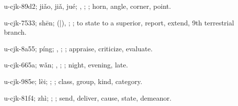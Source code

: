 \begin{multicols}{2}
{\cjkgGlue{}u-cjk-89d2; jiǎo, jiǎ, jué; \cjkgGlue{}, \cjkgGlue{}; \cjkgGlue{}; horn, angle, corner, point.

\cjkgGlue{}u-cjk-7533; shēn; \cjkgGlue{}\cjkgGlue{}(\cjkgGlue{}|\cjkgGlue{}), \cjkgGlue{}; \cjkgGlue{}; to state to a superior, report, extend, 9th terrestrial branch.

\cjkgGlue{}u-cjk-8a55; píng; \cjkgGlue{}, \cjkgGlue{}; \cjkgGlue{}; appraise, criticize, evaluate.

\cjkgGlue{}u-cjk-665a; wǎn; \cjkgGlue{}, \cjkgGlue{}; \cjkgGlue{}; night, evening, late.

\cjkgGlue{}u-cjk-985e; lèi; \cjkgGlue{}\cjkgGlue{}\cjkgGlue{}; \cjkgGlue{}; class, group, kind, category.

\cjkgGlue{}u-cjk-81f4; zhì; \cjkgGlue{}\cjkgGlue{}\cjkgGlue{}; \cjkgGlue{}; send, deliver, cause, state, demeanor.

}
\end{multicols}
